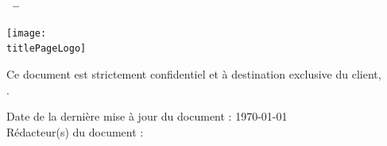 \thispagestyle{empty}
\begin{center}
       \vspace*{0.15\textheight}
       \textbf{\huge {\docType~--~\client}}
       
       \vspace{0.8cm}
       \textbf{\huge \projectName}   
       
       \vspace{0.8cm}
       \texttt{[image: \\titlePageLogo]}
       \vspace{0.8cm}
       
       
       \textbf{\huge \documentName}
       \vfill
       
       
       Ce document est strictement confidentiel et à destination exclusive du client,\\ \client .
       
       \vspace{0.8cm}
       
       
       Date de la dernière mise à jour du document : \today \\
       Rédacteur(s) du document : \redactor
            
\end{center}
\newpage
\tableofcontents
\newpage